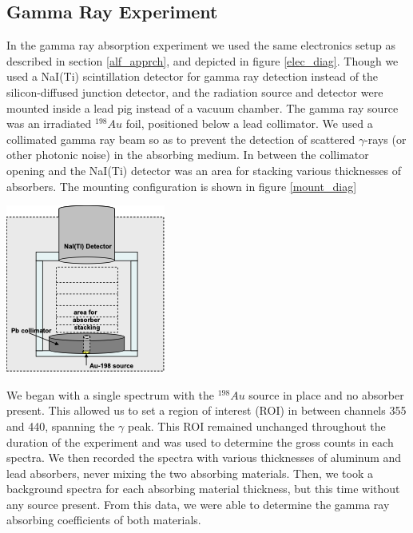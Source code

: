 \documentclass[10pt]{article}
\newenvironment{Figure}
{\par\medskip\noindent\minipage{\linewidth}}
{\endminipage\par\medskip}
\begin{document}
\begin{multicols}{2}
\subsection{Gamma Ray Experiment}
In the gamma ray absorption experiment we used the same electronics setup as described in section \ref{alf_apprch}, and depicted in figure \ref{elec_diag}.  Though we used a NaI(Ti) scintillation detector for gamma ray detection instead of the silicon-diffused junction detector, and the radiation source and detector were mounted inside a lead pig instead of a vacuum chamber.  The gamma ray source was an irradiated $^{198}Au$ foil, positioned below a lead collimator.  We used a collimated gamma ray beam so as to prevent the detection of scattered $\gamma$-rays (or other photonic noise) in the absorbing medium.  In between the collimator opening and the NaI(Ti) detector was an area for stacking various thicknesses of absorbers.  The mounting configuration is shown in figure \ref{mount_diag}

\begin{Figure}
	\centering
	\includegraphics[width=.75\textwidth,keepaspectratio]{mount_diag.png}
\end{Figure} 

We began with a single spectrum with the $^{198}Au$ source in place and no absorber present.  This allowed us to set a region of interest (ROI) in between channels 355 and 440, spanning the $\gamma$ peak.  This ROI remained unchanged throughout the duration of the experiment and was used to determine the gross counts in each spectra.  We then recorded the spectra with various thicknesses of aluminum and lead absorbers, never mixing the two absorbing materials.  Then, we took a background spectra for each absorbing material thickness, but this time without any source present.  From this data, we were able to determine the gamma ray absorbing coefficients of both materials.



\end{multicols}
\end{document}
